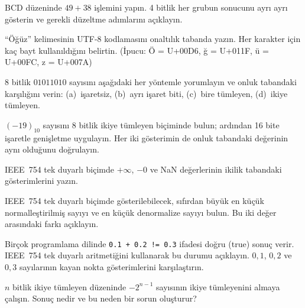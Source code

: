 \begin{alistirma}[\orta]
BCD düzeninde $49 + 38$ işlemini yapın. 4 bitlik her grubun sonucunu ayrı ayrı gösterin ve gerekli düzeltme adımlarını açıklayın.
\end{alistirma}

\begin{alistirma}[\orta]
``Öğüz'' kelimesinin UTF-8 kodlamasını onaltılık tabanda yazın. Her karakter için kaç bayt kullanıldığını belirtin. (İpucu: Ö = U+00D6, ğ = U+011F, ü = U+00FC, z = U+007A)
\end{alistirma}

\begin{alistirma}[\orta]
8 bitlik $01011010$ sayısını aşağıdaki her yöntemle yorumlayın ve onluk tabandaki karşılığını verin: (a)~işaretsiz, (b)~ayrı işaret biti, (c)~bire tümleyen, (d)~ikiye tümleyen.
\end{alistirma}

\begin{alistirma}[\orta]
$(-19)_{10}$ sayısını 8 bitlik ikiye tümleyen biçiminde bulun; ardından 16 bite işaretle genişletme uygulayın. Her iki gösterimin de onluk tabandaki değerinin aynı olduğunu doğrulayın.
\end{alistirma}

\begin{alistirma}[\zor]
IEEE~754 tek duyarlı biçimde $+\infty$, $-0$ ve NaN değerlerinin ikilik tabandaki gösterimlerini yazın.
\end{alistirma}

\begin{alistirma}[\zor]
IEEE~754 tek duyarlı biçimde gösterilebilecek, sıfırdan büyük en küçük normalleştirilmiş sayıyı ve en küçük denormalize sayıyı bulun. Bu iki değer arasındaki farkı açıklayın.
\end{alistirma}

\begin{alistirma}[\zor]
Birçok programlama dilinde \texttt{0.1 + 0.2 != 0.3} ifadesi doğru (true) sonuç verir. IEEE~754 tek duyarlı aritmetiğini kullanarak bu durumu açıklayın. $0{,}1$, $0{,}2$ ve $0{,}3$ sayılarının kayan nokta gösterimlerini karşılaştırın.
\end{alistirma}

\begin{alistirma}[\zor]
$n$ bitlik ikiye tümleyen düzeninde $-2^{n-1}$ sayısının ikiye tümleyenini almaya çalışın. Sonuç nedir ve bu neden bir sorun oluşturur?
\end{alistirma}
